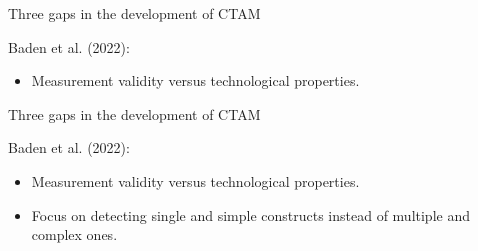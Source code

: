 \documentclass[compress]{beamer}
\begin{document}
\begin{frame}{Three gaps in the development of CTAM}
	
\begin{alertblock}{Baden et al. (2022):}
\begin{itemize}
	\item Measurement validity versus technological properties.
\end{itemize}
\end{alertblock}	



\end{frame}


\begin{frame}{Three gaps in the development of CTAM}
	
\begin{alertblock}{Baden et al. (2022):}
\begin{itemize}
	\item Measurement validity versus technological properties.
	\item Focus on detecting single and simple constructs instead of multiple and complex ones.
\end{itemize}
\end{alertblock}

\end{frame}
\end{document}

